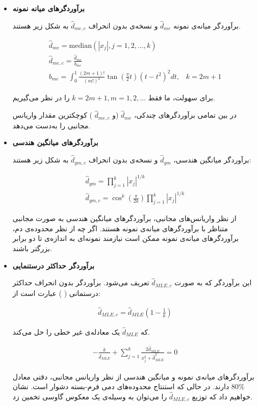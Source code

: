 \begin{itemize}
\item
\textbf{
برآوردگرهای میانه نمونه
}

برآوردگر‌ میانه‌ی نمونه 
$\hat{d}_{me}$
و نسخه‌ی بدون انحراف
$\hat{d}_{me,c}$
به شکل زیر هستند.

\begin{align}
\hat{d}_{me} = \mathrm{median} \left( \left| x_j \right|, j=1,2, \ldots, k \right)\\
\hat{d}_{me,c} = \frac{\hat{d}_{me}}{b_{me}}\\
b_{me} = \int_0^1 \frac{(2m+1)!}{(m!)^2} \tan \left( \frac{\pi}{2} t \right) \left( t - t^2 \right)^2 dt, \;\;\; k = 2m+1
\label{eq:1iT}
\end{align}

برای سهولت، ما فقط 
$k = 2m+1, m = 1,2, \ldots$
را در نظر می‌گیریم.

در بین تمامی برآوردگرهای چندکی، 
$\hat{d}_{me}$
(و 
$\hat{d}_{me,c}$
) کوچکترین مقدار واریانس مجانبی را به‌دست می‌دهد.

\item
\textbf{
برآوردگرهای میانگین هندسی
}

برآوردگر میانگین هندسی، 
$\hat{d}_{gm}$
و نسخه‌ی بدون انحراف 
$\hat{d}_{gm,c}$
به شکل زیر هستند:

\begin{align}
\hat{d}_{gm} = \prod_{j=1}^k \left| x_j \right|^{1/k}\\
\hat{d}_{gm,c} = \cos^k \left( \frac{\pi}{2k} \right) \prod_{j=1}^k \left| x_j \right|^{1/k}
\label{eq:1iU.0}
\end{align}

از نظر واریانس‌های مجانبی، برآوردگرهای میانگین هندسی به صورت مجانبی متناظر با برآوردگرهای میانه‌ی نمونه هستند. اگر چه از نظر محدوده‌ی دم، برآوردگرهای میانه‌ی نمونه ممکن است نیازمند نمونه‌ای به اندازه‌ی تا دو برابر بزرگتر باشند.

\item
\textbf{
برآوردگر حداکثر درستنمایی
}

این برآوردگر که به صورت 
$\hat{d}_{MLE,c}$
تعریف می‌شود. برآوردگر بدون انحراف حداکثر درستمانی (
) عبارت است از:

\begin{align}
\hat{d}_{MLE,c} = \hat{d}_{MLE} \left( 1 - \frac{1}{k} \right)
\label{eq:1iU.1}
\end{align}

که 
$\hat{d}_{MLE}$
یک معادله‌ی غیر خطی 
را حل می‌کند.

\begin{align}
- \frac{k}{\hat{d}_{MLE}} + \sum_{j=1}^k \frac{2\hat{d}_{MLE}}{x_j^2 + \hat{d}_{MLE}^2 } = 0
\label{eq:1iV}
\end{align}

برآوردگرهای میانه‌ی نمونه و میانگین هندسی از نظر واریانس مجانبی، دقتی معادل 
$80\%$
دارند. در حالی که استنتاج محدوده‌های دمی فرم-بسته دشوار است. نشان‌ خواهیم داد که توزیع 
$\hat{d}_{MLE,c}$
را می‌توان به وسیله‌ی یک معکوس گاوسی%
تخمین زد.

\end{itemize}




